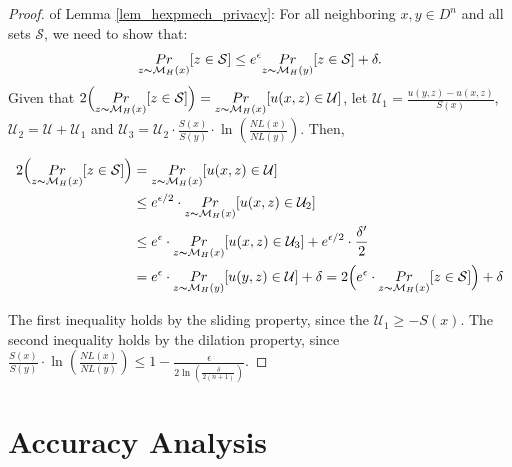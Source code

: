 \begin{proof}
of Lemma \ref{lem_hexpmech_privacy}: For all neighboring $x, y \in D^n$ and all sets $\mathcal{S}$, we need to show that:
\begin{equation*}
\underset{z \thicksim \mathcal{M}_H(x)}{Pr}[ z \in \mathcal{S}] \leq e^{\epsilon} \underset{z \thicksim \mathcal{M}_H(y)}{Pr}[z \in \mathcal{S}] + \delta. 
\end{equation*}
Given that $2\Big( \underset{z \thicksim \mathcal{M}_H(x)}{Pr}[ z \in \mathcal{S}]\Big) = \underset{z \thicksim \mathcal{M}_H(x)}{Pr}[ u(x,z) \in \mathcal{U}]$, let $\mathcal{U}_1 = \frac{u(y,z) - u(x,z)}{S(x)}$, $\mathcal{U}_2 = \mathcal{U} + \mathcal{U}_1$ and $\mathcal{U}_3 = \mathcal{U}_2 \cdot \frac{S(x)}{S(y)} \cdot \ln(\frac{NL(x)}{NL(y)})$. Then,

\begin{equation*}
\begin{split}
2\Big( \underset{z \thicksim \mathcal{M}_H(x)}{Pr}[ z \in \mathcal{S}]\Big)
& = \underset{z \thicksim \mathcal{M}_H(x)}{Pr}[ u(x,z) \in \mathcal{U}]\\
& \leq e^{\epsilon / 2} \cdot \underset{z \thicksim \mathcal{M}_H(x)}{Pr}[ u(x,z) \in \mathcal{U}_2]\\
& \leq e^{\epsilon} \cdot \underset{z \thicksim \mathcal{M}_H(x)}{Pr}[ u(x,z) \in \mathcal{U}_3] + e^{\epsilon/2} \cdot \frac{\delta'}{2}\\
& = e^{\epsilon} \cdot \underset{z \thicksim \mathcal{M}_H(y)}{Pr}[ u(y,z) \in \mathcal{U}] + \delta = 2\Big( e^{\epsilon} \cdot \underset{z \thicksim \mathcal{M}_H(x)}{Pr}[ z \in \mathcal{S}] \Big) + \delta\\
\end{split}
\end{equation*}

The first inequality holds by the sliding property, since the $\mathcal{U}_1 \geq -S(x)$. The second inequality holds by the dilation property, since $\frac{S(x)}{S(y)} \cdot \ln(\frac{NL(x)}{NL(y)}) \leq 1 - \frac{\epsilon}{2 \ln (\frac{\delta}{2 (n + 1)})}$.

\end{proof}

\section{Accuracy Analysis}
